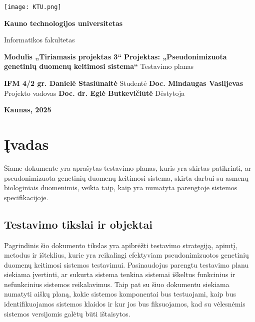 \documentclass[12pt]{article}
\begin{document}

\begin{titlepage}
\vskip 20pt
\begin{center}
\texttt{[image: KTU.png]}
\end{center}


\vskip 20pt
\centerline{\bf \large \textbf{Kauno technologijos universitetas}}
\bigskip
\centerline{\large {Informatikos fakultetas}}
\bigskip

\vskip 90pt
\begin{center}
    {\bf \LARGE Modulis „Tiriamasis projektas 3“}
    \vskip 10pt
    {\bf \Large Projektas: „Pseudonimizuota genetinių duomenų keitimosi sistema“}
    \vskip 15pt
    {\large Testavimo planas}
\end{center}

\vskip 40pt

\hskip 200pt {\bf \large IFM 4/2 gr. Danielė Stasiūnaitė}
\vskip 1pt
\hskip 200pt {\large Studentė}
\vskip 7pt
\hskip 200pt {\bf \large Doc. Mindaugas Vasiljevas}
\vskip 1pt
\hskip 200pt {\large Projekto vadovas}
\vskip 7pt
\hskip 200pt {\bf \large Doc. dr. Eglė Butkevičiūtė}
\vskip 1pt
\hskip 200pt {\large Dėstytoja}

\bigskip

\vskip 100pt
\centerline{\large \textbf{Kaunas, 2025}}
\newpage
\end{titlepage}



\tableofcontents
\newpage

\section{Įvadas}
Šiame dokumente yra aprašytas testavimo planas, kuris yra skirtas patikrinti, ar
pseudonimizuota genetinių duomenų keitimosi sistema, skirta darbui su asmenų
biologiniais duomenimis, veikia taip, kaip yra numatyta parengtoje sistemos
specifikacijoje.

\subsection{Testavimo tikslai ir objektai}
Pagrindinis šio dokumento tikslas yra apibrėžti testavimo strategiją,
apimtį, metodus ir išteklius, kurie yra reikalingi efektyviam pseudonimizuotos
genetinių duomenų keitimosi sistemos testavimui. Pasinaudojus parengtu testavimo
planu siekiama įvertinti, ar sukurta sistema tenkina sistemai iškeltus
funkcinius ir nefunkcinius sistemos reikalavimus. Taip pat su šiuo dokumentu
siekiama numatyti aiškų planą, kokie sistemos komponentai bus testuojami,
kaip bus identifikuojamos sistemos klaidos ir kur jos bus fiksuojamos, kad su
vėlesnėmis sistemos versijomis galėtų būti ištaisytos.
\end{document}
